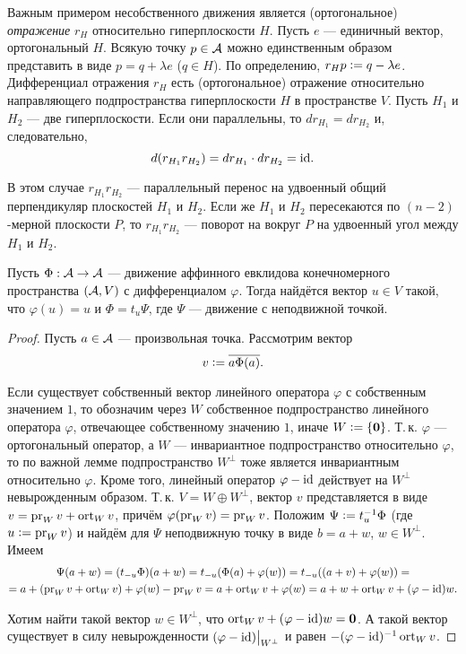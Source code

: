 \begin{example}
    Важным примером несобственного движения является (ортогональное) \textit{отражение} $r_H$ относительно гиперплоскости $H$. Пусть $e$ --- единичный вектор, ортогональный $H$. Всякую точку $p \in \mathcal{A}$ можно единственным образом представить в виде $p = q + \lambda e$ ($q \in H$). По определению, $r_Hp \vcentcolon = q - \lambda e$. Дифференциал отражения $r_H$ есть (ортогональное) отражение относительно направляющего подпространства гиперплоскости $H$ в пространстве $V$. Пусть $H_1$ и $H_2$ --- две гиперплоскости. Если они параллельны, то $dr_{H_1} = dr_{H_2}$ и, следовательно,
    \[
        d(r_{H_1}r_{H_2}) = dr_{H_1} \cdot dr_{H_2} = \mathrm{id}.
    \]

    В этом случае $r_{H_1}r_{H_2}$ --- параллельный перенос на удвоенный общий перпендикуляр плоскостей $H_1$ и $H_2$. Если же $H_1$ и $H_2$ пересекаются по $(n - 2)$-мерной плоскости $P$, то $r_{H_1}r_{H_2}$ --- поворот на вокруг $P$ на удвоенный угол между $H_1$ и $H_2$.
\end{example}

\begin{theorem}
    Пусть $\Phi: \mathcal{A} \to \mathcal{A}$ --- движение аффинного евклидова конечномерного пространства $(\mathcal{A}, V)$ с дифференциалом $\varphi$. Тогда найдётся вектор $u \in V$ такой, что $\varphi(u) = u$ и $\Phi = t_u\Psi$, где $\Psi$ --- движение с неподвижной точкой.
\end{theorem}

\begin{proof}
    Пусть $a \in \mathcal{A}$ --- произвольная точка. Рассмотрим вектор
    \[
        v \vcentcolon = \overline{a\Phi(a)}.
    \]

    Если существует собственный вектор линейного оператора $\varphi$ с собственным значением $1$, то обозначим через $W$ собственное подпространство линейного оператора $\varphi$, отвечающее собственному значению $1$, иначе $W \vcentcolon = \{\boldsymbol{0}\}$. Т.\,к. $\varphi$ --- ортогональный оператор, а $W$ --- инвариантное подпространство относительно $\varphi$, то по важной лемме подпространство $W^\perp$ тоже является инвариантным относительно $\varphi$. Кроме того, линейный оператор $\varphi - \mathrm{id}$ действует на $W^\perp$ невырожденным образом. Т.\,к. $V = W \oplus W^\perp$, вектор $v$ представляется в виде $v = \operatorname{pr}_Wv + \operatorname{ort}_Wv$, причём $\varphi(\operatorname{pr}_Wv) = \operatorname{pr}_Wv$. Положим $\Psi \vcentcolon = t_u^{-1}\Phi$ (где $u \vcentcolon = \operatorname{pr}_Wv$) и найдём для $\Psi$ неподвижную точку в виде $b = a + w$, $w \in W^\perp$. Имеем
    \begin{multline*}
        \Psi(a + w) = (t_{-u}\Phi)(a + w) = t_{-u}(\Phi(a) + \varphi(w)) = t_{-u}((a + v) + \varphi(w)) =\\ = a + (\operatorname{pr}_Wv + \operatorname{ort}_Wv) + \varphi(w) - \operatorname{pr}_Wv = a + \operatorname{ort}_Wv + \varphi(w) = a + w + \operatorname{ort}_Wv + (\varphi - \mathrm{id})w.
    \end{multline*}

    Хотим найти такой вектор $w \in W^\perp$, что $\operatorname{ort}_Wv + (\varphi - \mathrm{id})w = \boldsymbol{0}$. А такой вектор существует в силу невырожденности $(\varphi - \mathrm{id})\big|_{W^\perp}$ и равен $-(\varphi - \mathrm{id})^{-1}\operatorname{ort}_Wv$.
\end{proof}

